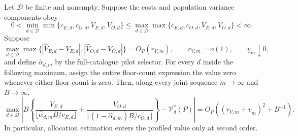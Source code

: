 Let \(\mathcal D\) be finite and nonempty. Suppose the costs and population variance components obey
\[
0<\min_{d\in\mathcal D}\min\{c_{E,d},c_{O,d},V_{E,d},V_{O,d}\}
\le
\max_{d\in\mathcal D}\max\{c_{E,d},c_{O,d},V_{E,d},V_{O,d}\}<\infty.
\]
Suppose
\[
\max_{d\in\mathcal D}\max\bigl\{
|\widehat V_{E,d}-V_{E,d}|,
|\widehat V_{O,d}-V_{O,d}|\bigr\}=O_P(r_{V,m}),
\qquad r_{V,m}=o(1),
\qquad \underline v_m\downarrow0,
\]
and define \(\widehat\alpha_{d,m}\) by the full-catalogue pilot selector. For every \(d\) inside the following maximum, assign the entire floor-count expression the value zero whenever either floor count is zero. Then, along every joint sequence \(m\to\infty\) and \(B\to\infty\),
\[
\max_{d\in\mathcal D}\left|B\left\{
\frac{V_{E,d}}{\lfloor\widehat\alpha_{d,m}B/c_{E,d}\rfloor}
+\frac{V_{O,d}}{\lfloor(1-\widehat\alpha_{d,m})B/c_{O,d}\rfloor}
\right\}-\mathcal V_d^*(P)\right|
=O_P\!\left((r_{V,m}+\underline v_m)^2+B^{-1}\right).
\]
In particular, allocation estimation enters the profiled value only at second order.